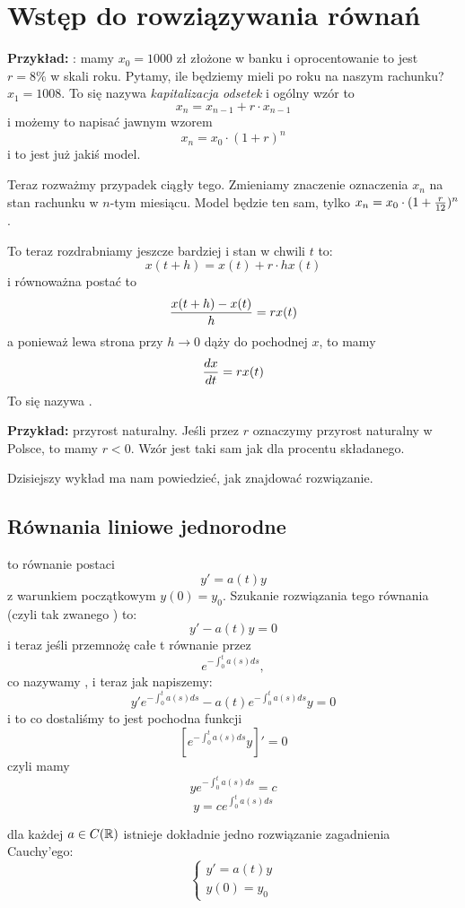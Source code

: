 \section{Wstęp do rowziązywania równań}

\textbf{Przykład:} : mamy $x_0=1000$ zł złożone w banku i oprocentowanie to jest $r = 8\%$ w skali roku. Pytamy, ile będziemy mieli po roku na naszym rachunku? $x_1=1008$. To się nazywa \emph{kapitalizacja odsetek} i ogólny wzór to
$$x_n=x_{n-1}+r\cdot x_{n-1}$$
i możemy to napisać jawnym wzorem
$$x_n=x_0\cdot(1+r)^n$$
i to jest już jakiś model. 

Teraz rozważmy przypadek ciągły tego. Zmieniamy znaczenie oznaczenia $x_n$ na stan rachunku w $n$-tym miesiącu. Model będzie ten sam, tylko $x_n=x_0\cdot(1+{r\over12})^n$.

To teraz rozdrabniamy jeszcze bardziej i stan w chwili $t$ to:
$$x(t+h)=x(t)+r\cdot h x(t)$$
i równoważna postać to
$${x(t+h)-x(t)\over h}=rx(t)$$
a ponieważ lewa strona przy $h\to 0$ dąży do pochodnej $x$, to mamy
$${dx\over dt}=rx(t)$$
To się nazywa .
\smallskip

\textbf{Przykład:} przyrost naturalny. Jeśli przez $r$ oznaczymy przyrost naturalny w Polsce, to mamy $r<0$. Wzór jest taki sam jak dla procentu składanego.

Dzisiejszy wykład ma nam powiedzieć, jak znajdować rozwiązanie.

\subsection{Równania liniowe jednorodne}

 to równanie postaci
$$y'=a(t)y$$
z warunkiem początkowym $y(0)=y_0$. Szukanie rozwiązania tego równania (czyli tak zwanego ) to:
$$y'-a(t)y=0$$
i teraz jeśli przemnożę całe t równanie przez
$$e^{-\int_0^t a(s)ds},$$
co nazywamy , i teraz jak napiszemy:
$$y'e^{-\int_0^ta(s)ds}-a(t)e^{-\int_0^ta(s)ds}y=0$$
i to co dostaliśmy to jest pochodna funkcji
$$\left[e^{-\int_0^ta(s)ds}y\right]'=0$$
czyli mamy
$$ye^{-\int_0^ta(s)ds}=c$$
$$y=ce^{\int_0^ta(s)ds}$$

 dla każdej $a\in C(\mathbb{R})$ istnieje dokładnie jedno rozwiązanie zagadnienia Cauchy'ego:
$$\begin{cases}
    y'=a(t)y\\
    y(0)=y_0
\end{cases}$$


